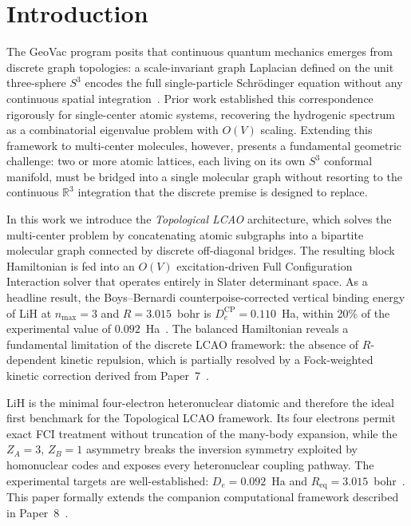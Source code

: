 \documentclass[aps,pra,twocolumn,superscriptaddress,longbibliography]{revtex4-2}
\begin{document}
\maketitle

\section{Introduction}
\label{sec:intro}

The GeoVac program posits that continuous quantum mechanics emerges from
discrete graph topologies: a scale-invariant graph Laplacian defined on
the unit three-sphere $S^3$ encodes the full single-particle
Schr\"odinger equation without any continuous spatial
integration~\cite{paper0,paper1,paper7}.  Prior work established this
correspondence rigorously for single-center atomic systems, recovering
the hydrogenic spectrum as a combinatorial eigenvalue problem with $O(V)$
scaling.  Extending this framework to multi-center molecules, however,
presents a fundamental geometric challenge: two or more atomic lattices,
each living on its own $S^3$ conformal manifold, must be bridged into a
single molecular graph without resorting to the continuous
$\mathbb{R}^3$ integration that the discrete premise is designed to
replace.

In this work we introduce the \emph{Topological LCAO} architecture,
which solves the multi-center problem by concatenating atomic subgraphs
into a bipartite molecular graph connected by discrete off-diagonal
bridges.  The resulting block Hamiltonian is fed into an $O(V)$
excitation-driven Full Configuration Interaction solver that operates
entirely in Slater determinant space.  As a headline result, the
Boys--Bernardi counterpoise-corrected vertical binding energy of LiH at
$n_{\max}=3$ and $R=3.015$~bohr is
$D_{e}^{\mathrm{CP}}=0.110$~Ha, within 20\% of the experimental value
of $0.092$~Ha~\cite{huber}.  The balanced Hamiltonian reveals a
fundamental limitation of the discrete LCAO framework: the absence of
$R$-dependent kinetic repulsion, which is partially resolved by a
Fock-weighted kinetic correction derived from Paper~7~\cite{paper7}.

LiH is the minimal four-electron heteronuclear diatomic and therefore
the ideal first benchmark for the Topological LCAO framework.  Its four
electrons permit exact FCI treatment without truncation of the many-body
expansion, while the $Z_A=3$, $Z_B=1$ asymmetry breaks the inversion
symmetry exploited by homonuclear codes and exposes every heteronuclear
coupling pathway.  The experimental targets are well-established:
$D_e = 0.092$~Ha and $R_{\mathrm{eq}}=3.015$~bohr~\cite{huber}.  This
paper formally extends the companion computational framework described
in Paper~8~\cite{paper8}.
\end{document}
